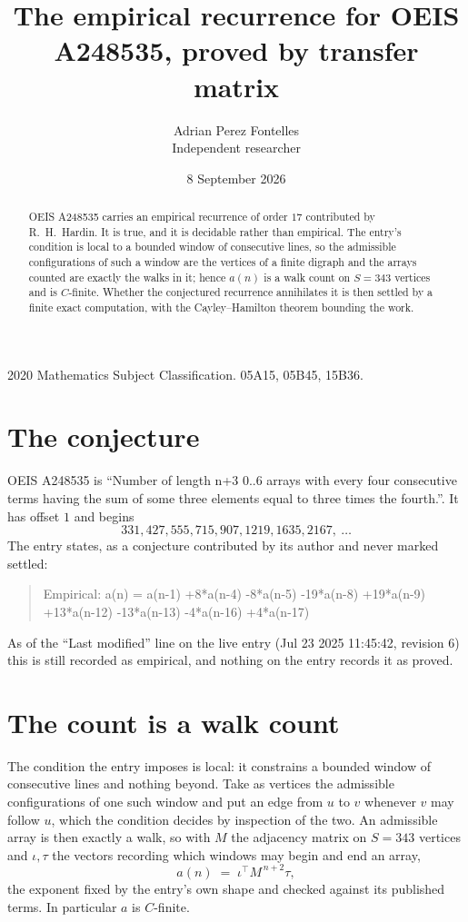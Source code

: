 \documentclass[11pt,a4paper]{article}
\title{The empirical recurrence for OEIS A248535, proved by transfer matrix}
\author{Adrian Perez Fontelles\\ \small Independent researcher}
\date{8 September 2026}
\theoremstyle{plain}
\theoremstyle{definition}
\begin{document}
\maketitle

\begin{abstract}
OEIS A248535 carries an empirical recurrence of order $17$ contributed by R.~H.~Hardin. It is
true, and it is decidable rather than empirical. The entry's condition is local to a bounded window of consecutive lines, so
the admissible configurations of such a window are the vertices of a finite digraph and the
arrays counted are exactly the walks in it; hence $a(n)$ is a walk count on $S=343$ vertices
and is $C$-finite. Whether the conjectured recurrence annihilates it is then settled by a
finite exact computation, with the Cayley--Hamilton theorem bounding the work.
\end{abstract}

\noindent\small 2020 Mathematics Subject Classification. 05A15, 05B45, 15B36.\normalsize

\section{The conjecture}

OEIS A248535 is ``Number of length n+3 0..6 arrays with every four consecutive terms having the sum of some three elements equal to three times the fourth.''. It has offset $1$ and begins
\[
331, 427, 555, 715, 907, 1219, 1635, 2167,\ \dots
\]
The entry states, as a conjecture contributed by its author and never marked settled:
\begin{quote}
Empirical: a(n) = a(n-1) +8*a(n-4) -8*a(n-5) -19*a(n-8) +19*a(n-9) +13*a(n-12) -13*a(n-13) -4*a(n-16) +4*a(n-17)
\end{quote}
As of the ``Last modified'' line on the live entry (Jul 23 2025 11:45:42, revision 6) this is still
recorded as empirical, and nothing on the entry records it as proved.

\section{The count is a walk count}

The condition the entry imposes is local: it constrains a bounded window of consecutive lines and nothing beyond. Take as
vertices the admissible configurations of one such window and put an edge from $u$ to $v$
whenever $v$ may follow $u$, which the condition decides by inspection of the two. An
admissible array is then exactly a walk, so with $M$ the adjacency matrix on $S=343$ vertices
and $\iota,\tau$ the vectors recording which windows may begin and end an array,
\[
a(n)\;=\;\iota^{\!\top}M^{\,n+2}\tau ,
\]
the exponent fixed by the entry's own shape and checked against its published terms. In
particular $a$ is $C$-finite.
\end{document}
